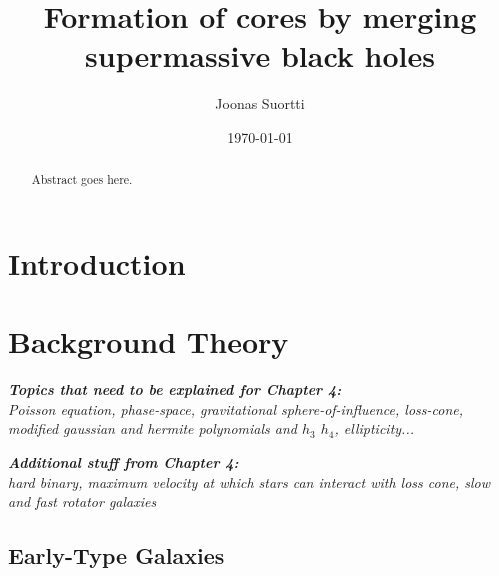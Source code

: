 \documentclass[english, oneside]{HYgradu}
\title{Formation of cores by merging supermassive black holes}
\author{Joonas Suortti}
\date{\today}
\begin{document}
\maketitle

\doublespacing

\begin{abstract}
Abstract goes here.
\end{abstract}

\mytableofcontents



\chapter{Introduction}

\chapter{Background Theory}

\textit{\textbf{Topics that need to be explained for Chapter 4:}
\\
Poisson equation, phase-space, gravitational sphere-of-influence, loss-cone, modified gaussian and hermite polynomials and $h_3$ $h_4$, ellipticity...}

\textit{\textbf{Additional stuff from Chapter 4:}
\\
hard binary, maximum velocity at which stars can interact with loss cone, slow and fast rotator galaxies}

\section{Early-Type Galaxies}
\end{document}
